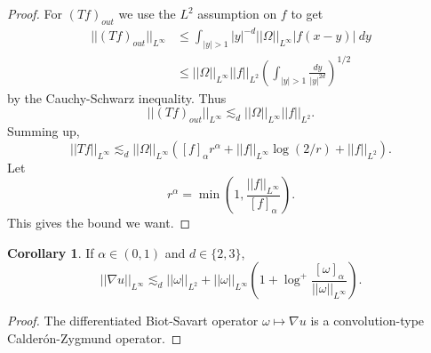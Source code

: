 \documentclass[12pt]{book}
\theoremstyle{definition}
\newtheorem{corollary}[theorem]{Corollary}
\begin{document}
\begin{proof}
For $(Tf)_{out}$ we use the $L^2$ assumption on $f$ to get
\begin{align*}
||(Tf)_{out}||_{L^\infty} &\leq \int_{|y| > 1} |y|^{-d} ||\Omega||_{L^\infty} |f(x - y)| ~dy\\
&\leq ||\Omega||_{L^\infty} ||f||_{L^2} \left(\int_{|y| > 1} \frac{dy}{|y|^{2d}}\right)^{1/2}
\end{align*}
by the Cauchy-Schwarz inequality. Thus
$$||(Tf)_{out}||_{L^\infty} \lesssim_d ||\Omega||_{L^\infty} ||f||_{L^2}.$$
Summing up,
$$||Tf||_{L^\infty} \lesssim_d ||\Omega||_{L^\infty} ([f]_\alpha r^\alpha + ||f||_{L^\infty} \log(2/r) + ||f||_{L^2}).$$
Let
$$r^\alpha = \min(1, \frac{||f||_{L^\infty}}{[f]_\alpha}).$$
This gives the bound we want.
\end{proof}

\begin{corollary}
If $\alpha \in (0, 1)$ and $d \in \{2, 3\}$,
$$||\nabla u||_{L^\infty} \lesssim_d ||\omega||_{L^2} + ||\omega||_{L^\infty}(1 + \log^+ \frac{[\omega]_\alpha}{||\omega||_{L^\infty}}).$$
\end{corollary}
\begin{proof}
The differentiated Biot-Savart operator $\omega \mapsto \nabla u$ is a convolution-type Calder\'on-Zygmund operator.
\end{proof}
\end{document}
